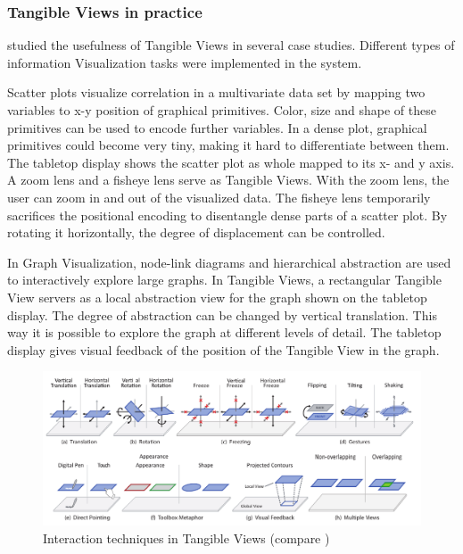 \subsubsection{Tangible Views in practice}
\cite{spindler10} studied the usefulness of Tangible Views in several case studies. Different types of information Visualization tasks were implemented in the system. 

Scatter plots visualize correlation in a multivariate data set by mapping two variables to x-y position of graphical primitives. Color, size and shape of these primitives can be used to encode further variables. In a dense plot, graphical primitives could become very tiny, making it hard to differentiate between them. The tabletop display shows the scatter plot as whole mapped to its x- and y axis. A zoom lens and a fisheye lens serve as Tangible Views. With the zoom lens, the user can zoom in and out of the visualized data. The fisheye lens temporarily sacrifices the positional encoding to disentangle dense parts of a scatter plot. By rotating it horizontally, the degree of displacement can be controlled. 

In Graph Visualization, node-link diagrams and hierarchical abstraction are used to interactively explore large graphs. In Tangible Views, a rectangular Tangible View servers as a local abstraction view for the graph shown on the tabletop display. The degree of abstraction can be changed by vertical translation. This way it is possible to explore the graph at different levels of detail. The tabletop display gives visual feedback of the position of the Tangible View in the graph. 

\begin{figure}[htb]
\centering
\includegraphics[width=1.0\textwidth]{figures/tangible_views_interaction.pdf}
\caption{Interaction techniques in Tangible Views (compare )}
\label{fig:tangible_views_interaction}
\end{figure}

